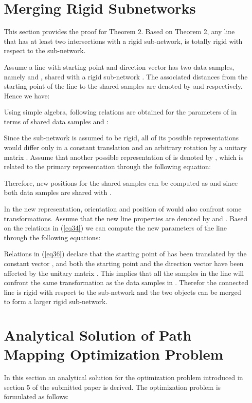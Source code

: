 \documentclass[10pt,journal,cspaper,compsoc]{IEEEtran}
\begin{document}
\section{Merging Rigid Subnetworks}
This section provides the proof for Theorem 2. Based on Theorem 2, any line that has at least two intersections with a rigid sub-network, is totally rigid with respect to the sub-network. 

Assume a line  with starting point  and direction vector  has two data samples, namely  and , shared with a rigid sub-network . The associated distances from the starting point of the line to the shared samples are denoted by  and  respectively. Hence we have:

	
Using simple algebra, following relations are obtained for the parameters of  in terms of shared data samples  and :


Since the sub-network  is assumed to be rigid, all of its possible representations would differ only in a constant translation  and an arbitrary rotation by a unitary matrix . Assume that another possible representation of  is denoted by , which is related to the primary representation through the following equation:


Therefore, new positions for the shared samples can be computed as  and  since both data samples are shared with .

In the new representation, orientation and position of  would also confront some transformations. Assume that the new line properties are denoted  by  and . Based on the relations in (\ref{eq34}) we can compute the new parameters of the line  through the following equations:


Relations in (\ref{eq36}) declare that the starting point of  has been translated by the constant vector , and both the starting point and the direction vector have been affected by the unitary matrix . This implies that all the samples in the line  will confront the same transformation as the data samples in . Therefor the connected line is rigid with respect to the sub-network and the two objects can be merged to form a larger rigid sub-network.

\section{Analytical Solution of Path Mapping Optimization Problem}
In this section an analytical solution for the optimization problem introduced in section 5 of the submitted paper is derived. The optimization problem is formulated as follows:
\end{document}
